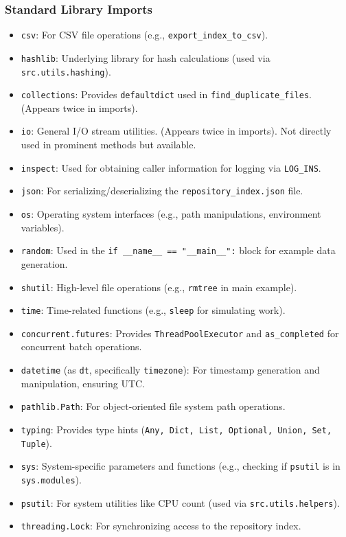 \documentclass{article}
\begin{document}
\subsubsection{Standard Library Imports}
\begin{itemize}
    \item \texttt{csv}: For CSV file operations (e.g., \texttt{export\_index\_to\_csv}).
    \item \texttt{hashlib}: Underlying library for hash calculations (used via \texttt{src.utils.hashing}).
    \item \texttt{collections}: Provides \texttt{defaultdict} used in \texttt{find\_duplicate\_files}. (Appears twice in imports).
    \item \texttt{io}: General I/O stream utilities. (Appears twice in imports). Not directly used in prominent methods but available.
    \item \texttt{inspect}: Used for obtaining caller information for logging via \texttt{LOG\_INS}.
    \item \texttt{json}: For serializing/deserializing the \texttt{repository\_index.json} file.
    \item \texttt{os}: Operating system interfaces (e.g., path manipulations, environment variables).
    \item \texttt{random}: Used in the \texttt{if \_\_name\_\_ == "\_\_main\_\_":} block for example data generation.
    \item \texttt{shutil}: High-level file operations (e.g., \texttt{rmtree} in main example).
    \item \texttt{time}: Time-related functions (e.g., \texttt{sleep} for simulating work).
    \item \texttt{concurrent.futures}: Provides \texttt{ThreadPoolExecutor} and \texttt{as\_completed} for concurrent batch operations.
    \item \texttt{datetime} (as \texttt{dt}, specifically \texttt{timezone}): For timestamp generation and manipulation, ensuring UTC.
    \item \texttt{pathlib.Path}: For object-oriented file system path operations.
    \item \texttt{typing}: Provides type hints (\texttt{Any, Dict, List, Optional, Union, Set, Tuple}).
    \item \texttt{sys}: System-specific parameters and functions (e.g., checking if \texttt{psutil} is in \texttt{sys.modules}).
    \item \texttt{psutil}: For system utilities like CPU count (used via \texttt{src.utils.helpers}).
    \item \texttt{threading.Lock}: For synchronizing access to the repository index.
\end{itemize}
\end{document}
